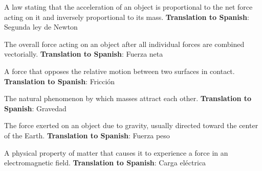 \begin{vocabulary}
A law stating that the acceleration of an object is proportional to the net force acting on it and inversely proportional to its mass. \newline
\textbf{Translation to Spanish}: Segunda ley de Newton \newline
\end{vocabulary}

\begin{vocabulary}
The overall force acting on an object after all individual forces are combined vectorially. \newline
\textbf{Translation to Spanish}: Fuerza neta \newline
\end{vocabulary}

\begin{vocabulary}[Friction]
A force that opposes the relative motion between two surfaces in contact. \newline
\textbf{Translation to Spanish}: Fricción \newline
\end{vocabulary}

\begin{vocabulary}[Gravity]
The natural phenomenon by which masses attract each other. \newline
\textbf{Translation to Spanish}: Gravedad \newline
\end{vocabulary}

\begin{vocabulary}
The force exerted on an object due to gravity, usually directed toward the center of the Earth. \newline
\textbf{Translation to Spanish}: Fuerza peso \newline
\end{vocabulary}

\begin{vocabulary}
A physical property of matter that causes it to experience a force in an electromagnetic field. \newline
\textbf{Translation to Spanish}: Carga eléctrica \newline
\end{vocabulary}
